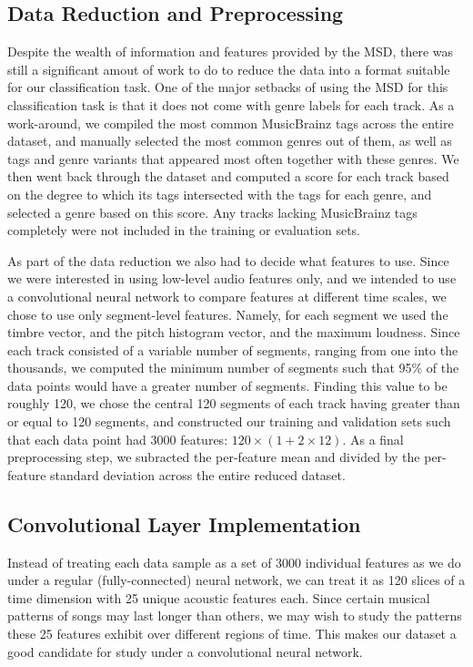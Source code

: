\documentclass{article} %
\begin{document}
\subsection{Data Reduction and Preprocessing}
Despite the wealth of information and features provided by the MSD, there was still a significant amout of work to do to reduce the data into a format suitable for our classification task. One of the major setbacks of using the MSD for this classification task is that it does not come with genre labels for each track. As a work-around, we compiled the most common MusicBrainz tags across the entire dataset, and manually selected the most common genres out of them, as well as tags and genre variants that appeared most often together with these genres. We then went back through the dataset and computed a score for each track based on the degree to which its tags intersected with the tags for each genre, and selected a genre based on this score. Any tracks lacking MusicBrainz tags completely were not included in the training or evaluation sets.
\par As part of the data reduction we also had to decide what features to use. Since we were interested in using low-level audio features only, and we intended to use a convolutional neural network to compare features at different time scales, we chose to use only segment-level features. Namely, for each segment we used the timbre vector, and the pitch histogram vector, and the maximum loudness. Since each track consisted of a variable number of segments, ranging from one into the thousands, we computed the minimum number of segments such that 95\% of the data points would have a greater number of segments. Finding this value to be roughly 120, we chose the central 120 segments of each track having greater than or equal to 120 segments, and constructed our training and validation sets such that each data point had 3000 features: $120 \times (1 + 2 \times 12)$. As a final preprocessing step, we subracted the per-feature mean and divided by the per-feature standard deviation across the entire reduced dataset.

\subsection{Convolutional Layer Implementation}
Instead of treating each data sample as a set of 3000 individual features as we do under a regular (fully-connected) neural network, we can treat it as 120 slices of a time dimension with 25 unique acoustic features each. Since certain musical patterns of songs may last longer than others, we may wish to study the patterns these 25 features exhibit over different regions of time. This makes our dataset a good candidate for study under a convolutional neural network.
\end{document}
